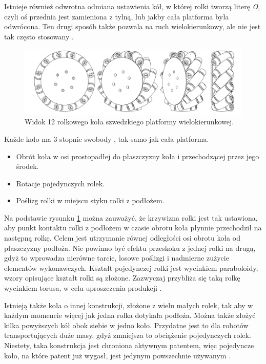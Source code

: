 	Istnieje również odwrotna odmiana ustawienia kół, w której rolki tworzą literę \emph{O}, 
	czyli oś przednia jest zamieniona z tylną, lub jakby cała platforma była odwrócona.
	Ten drugi sposób także pozwala na ruch wielokierunkowy, ale nie jest tak często stosowany \cite{paletobot}.

	\begin{figure}[H]
	\centering
	\includegraphics[width=\textwidth]{graphics/wheel.pdf}
	\caption{Widok 12 rolkowego koła szwedzkiego platformy wielokierunkowej.}
	\label{fig:wheel}
	\end{figure} 

	Każde koło ma 3 stopnie swobody \cite{kinematic_modeling}, tak samo jak cała platforma.
	\begin{itemize}
		\item Obrót koła w osi prostopadłej do płaszczyzny koła i przechodzącej przez jego środek.
		\item Rotacje pojedynczych rolek.
		\item Poślizg rolki w miejscu styku rolki z podłożem.
	\end{itemize}

	Na podstawie rysunku \ref{fig:wheel} można zauważyć, że krzywizna rolki jest tak ustawiona, aby punkt kontaktu rolki z podłożem w czasie obrotu koła płynnie przechodził na następną rolkę.
	Celem jest utrzymanie równej odległości osi obrotu koła od płaszczyzny podłoża.
	Nie powinno być efektu przeskoku z jednej rolki na drugą, gdyż to wprowadza nierówne tarcie, losowe poślizgi i nadmierne zużycie elementów wykonawczych.
	Kształt pojedynczej rolki jest wycinkiem paraboloidy, wzory opisujące kształt rolki są złożone.
	Zazwyczaj przybliża się taką rolkę wycinkiem torusa, w celu uproszczenia produkcji \cite{rollers}.

	Istnieją także koła o innej konstrukcji, złożone z wielu małych rolek, tak aby w każdym momencie więcej jak jedna rolka dotykała podłoża.
	Można także złożyć kilka powyższych kół obok siebie w jedno koło.
	Przydatne jest to dla robotów transportujących duże masy, gdyż zmniejsza to obciążenie pojedynczych rolek.
	Niestety, taka konstrukcja jest chroniona aktywnym patentem, więc pojedyncze koło, na które patent już wygasł, jest jedynym powszechnie używanym \cite{paletobot}.

